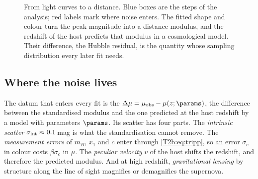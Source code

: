 \begin{figure}[htbp]
\centering
{}
\caption{From light curves to a distance. Blue boxes are the steps of the analysis; red labels mark where noise enters. The fitted shape and colour turn the peak magnitude into a distance modulus, and the redshift of the host predicts that modulus in a cosmological model. Their difference, the Hubble residual, is the quantity whose sampling distribution every later fit needs.}
\label{T2b:fig:sn-pipeline}
\end{figure}

\subsection{Where the noise lives}

The datum that enters every fit is the  $\Delta\mu=\mu_{\rm obs}-\mu(z;\params)$, the difference between the standardised modulus and the one predicted at the host redshift by a model with parameters $\params$. Its scatter has four parts. The \emph{intrinsic scatter} $\sigma_{\rm int}\approx0.1$\,mag is what the standardisation cannot remove. The \emph{measurement errors} of $m_B$, $x_1$ and $c$ enter through \eqref{T2b:eq:tripp}, so an error $\sigma_c$ in colour costs $\beta\sigma_c$ in $\mu$. The \emph{peculiar velocity} $v$ of the host  shifts the redshift, and therefore the predicted modulus. And at high redshift, \emph{gravitational lensing} by structure along the line of sight magnifies or demagnifies the supernova.

